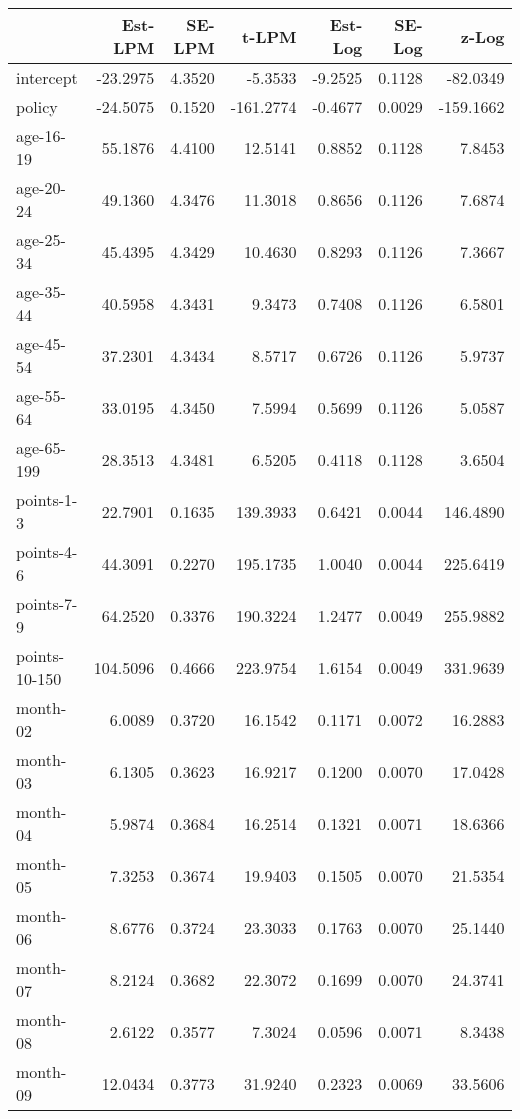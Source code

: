 \documentclass[10pt]{article}
\begin{document}
\begin{table}[ht]
\centering
\begin{tabular}{lrrrrrr}
  \hline
 & Est-LPM & SE-LPM & t-LPM & Est-Log & SE-Log & z-Log \\ 
  \hline
intercept & -23.2975 & 4.3520 & -5.3533 & -9.2525 & 0.1128 & -82.0349 \\ 
  policy & -24.5075 & 0.1520 & -161.2774 & -0.4677 & 0.0029 & -159.1662 \\ 
  age-16-19 & 55.1876 & 4.4100 & 12.5141 & 0.8852 & 0.1128 & 7.8453 \\ 
  age-20-24 & 49.1360 & 4.3476 & 11.3018 & 0.8656 & 0.1126 & 7.6874 \\ 
  age-25-34 & 45.4395 & 4.3429 & 10.4630 & 0.8293 & 0.1126 & 7.3667 \\ 
  age-35-44 & 40.5958 & 4.3431 & 9.3473 & 0.7408 & 0.1126 & 6.5801 \\ 
  age-45-54 & 37.2301 & 4.3434 & 8.5717 & 0.6726 & 0.1126 & 5.9737 \\ 
  age-55-64 & 33.0195 & 4.3450 & 7.5994 & 0.5699 & 0.1126 & 5.0587 \\ 
  age-65-199 & 28.3513 & 4.3481 & 6.5205 & 0.4118 & 0.1128 & 3.6504 \\ 
  points-1-3 & 22.7901 & 0.1635 & 139.3933 & 0.6421 & 0.0044 & 146.4890 \\ 
  points-4-6 & 44.3091 & 0.2270 & 195.1735 & 1.0040 & 0.0044 & 225.6419 \\ 
  points-7-9 & 64.2520 & 0.3376 & 190.3224 & 1.2477 & 0.0049 & 255.9882 \\ 
  points-10-150 & 104.5096 & 0.4666 & 223.9754 & 1.6154 & 0.0049 & 331.9639 \\ 
  month-02 & 6.0089 & 0.3720 & 16.1542 & 0.1171 & 0.0072 & 16.2883 \\ 
  month-03 & 6.1305 & 0.3623 & 16.9217 & 0.1200 & 0.0070 & 17.0428 \\ 
  month-04 & 5.9874 & 0.3684 & 16.2514 & 0.1321 & 0.0071 & 18.6366 \\ 
  month-05 & 7.3253 & 0.3674 & 19.9403 & 0.1505 & 0.0070 & 21.5354 \\ 
  month-06 & 8.6776 & 0.3724 & 23.3033 & 0.1763 & 0.0070 & 25.1440 \\ 
  month-07 & 8.2124 & 0.3682 & 22.3072 & 0.1699 & 0.0070 & 24.3741 \\ 
  month-08 & 2.6122 & 0.3577 & 7.3024 & 0.0596 & 0.0071 & 8.3438 \\ 
  month-09 & 12.0434 & 0.3773 & 31.9240 & 0.2323 & 0.0069 & 33.5606 \\ 

\end{tabular}
\end{table}
\end{document}
